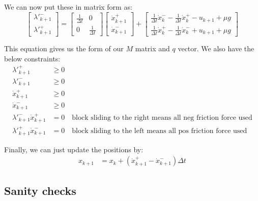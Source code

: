 \documentclass{article}
\begin{document}
We can now put these in matrix form as:
\[
    \begin{bmatrix}
        \lambda '^-_{k+1} \\
        \lambda '^+_{k+1}
    \end{bmatrix}
    =
    \begin{bmatrix}
        \frac{1}{\Delta t} & 0 \\
        0 & \frac{1}{\Delta t}
    \end{bmatrix}
    \begin{bmatrix}
        \dot x ^+_{k+1} \\
        \dot x ^-_{k+1}
    \end{bmatrix}
    +
    \begin{bmatrix}
        \frac{1}{\Delta t} \dot x^-_k - \frac{1}{\Delta t} \dot x^+_k - u_{k+1} + \mu g \\
        \frac{1}{\Delta t} \dot x^+_k - \frac{1}{\Delta t} \dot x^-_k + u_{k+1} + \mu g
    \end{bmatrix}
\]

This equation gives us the form of our $M$ matrix and $q$ vector. We also have the below constraints:
\begin{align*}
    \lambda'^+_{k+1} &\geq 0\\
    \lambda'^-_{k+1} &\geq 0 \\
    \dot x^+_{k+1} &\geq 0 \\
    \dot x^-_{k+1} &\geq 0 \\
    \lambda'^-_{k+1} \dot x^+_{k+1} &= 0 \quad \textrm{block sliding to the right means all neg friction force used} \\
    \lambda'^+_{k+1} \dot x^-_{k+1} &= 0 \quad \textrm{block sliding to the left means all pos friction force used}
\end{align*}

Finally, we can just update the positions by:
\begin{align*}
    x_{k+1} &= x_k + (\dot x^+_{k+1} - \dot x^-_{k+1})\Delta t
\end{align*}

\subsection{Sanity checks}
\end{document}

